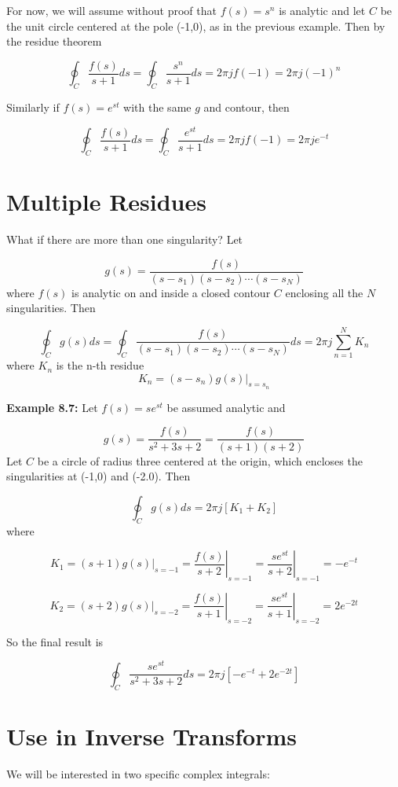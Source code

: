 \documentclass{article}
\begin{document}
For now, we will assume without proof that $f(s) = s^n$ is analytic and let $C$ be the unit circle centered at the pole (-1,0), as in the previous example. Then by the residue theorem

\[
\oint_C \frac{f(s)}{s+1} ds = \oint_C \frac{s^n}{s+1} ds = 2\pi j f(-1) = 2\pi j (-1)^n
\]

Similarly if $f(s) = e^{st}$ with the same $g$ and contour, then 

\[
\oint_C \frac{f(s)}{s+1} ds = \oint_C \frac{e^{st}}{s+1} ds = 2\pi j f(-1) = 2\pi j e^{-t}
\]

\section{Multiple Residues}

What if there are more than one singularity? Let

\[
g(s) = \frac{f(s)}{(s-s_1)(s-s_2)\cdots (s-s_N)}
\]
where $f(s)$ is analytic on and inside a closed contour $C$ enclosing all the $N$ singularities. Then

\[
\oint_C g(s) ds = \oint_C \frac{f(s)}{(s-s_1)(s-s_2)\cdots (s-s_N)} ds = 2\pi j \sum\limits_{n = 1}^{N} K_n 
\]
where $K_n$ is the n-th residue
\[
K_n = \left. (s-s_n)g(s) \right|_{s = s_n}
\]

\textbf{Example 8.7:} Let $f(s) = se^{st}$ be assumed analytic and

\[
g(s) = \frac{f(s)}{s^2 + 3s + 2} = \frac{f(s)}{(s+1)(s+2)} 
\]
Let $C$ be a circle of radius three centered at the origin, which encloses the singularities at (-1,0) and (-2.0). Then

\[
\oint_C g(s) ds = 2\pi j [K_1 + K_2]
\]
where

\[
K_1 = \left. (s+1)g(s) \right|_{s = -1} = \left. \frac{f(s)}{s+2} \right|_{s = -1} = \left. \frac{se^{st}}{s+2} \right|_{s = -1} = -e^{-t} 
\]

\[
K_2 = \left. (s+2)g(s) \right|_{s = -2} = \left. \frac{f(s)}{s+1} \right|_{s = -2} = \left. \frac{se^{st}}{s+1} \right|_{s = -2} = 2e^{-2t} 
\]

So the final result is

\[
\oint_C \frac{se^{st}}{s^2 + 3s + 2} ds = 2\pi j \left[-e^{-t} + 2e^{-2t} \right]
\]

\section{Use in Inverse Transforms}

We will be interested in two specific complex integrals:
\end{document}
